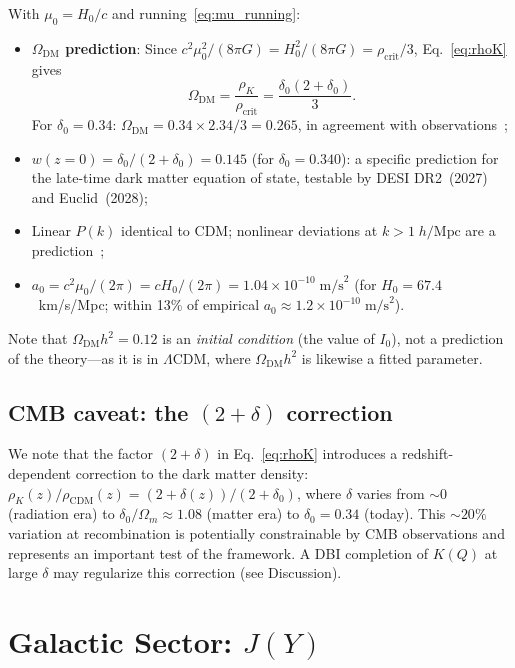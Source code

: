 \documentclass[prd,twocolumn,superscriptaddress,longbibliography,floatfix]{revtex4-2}
\begin{document}
With $\mu_0 = H_0/c$ and running~\eqref{eq:mu_running}:
\begin{itemize}
\item \textbf{$\Omega_{\mathrm{DM}}$ prediction}:
  Since $c^2\mu_0^2/(8\pi G) = H_0^2/(8\pi G) = \rho_{\mathrm{crit}}/3$,
  Eq.~\eqref{eq:rhoK} gives
  \begin{equation}
  \Omega_{\mathrm{DM}} = \frac{\rho_K}{\rho_{\mathrm{crit}}}
  = \frac{\delta_0(2+\delta_0)}{3}.
  \label{eq:OmegaDM}
  \end{equation}
  For $\delta_0 = 0.34$: $\Omega_{\mathrm{DM}} = 0.34 \times 2.34/3
  = 0.265$, in agreement with observations~\cite{Planck2018};
\item $w(z{=}0) = \delta_0/(2{+}\delta_0) = 0.145$
  (for $\delta_0 = 0.340$): a specific prediction for
  the late-time dark matter equation of state, testable by
  DESI DR2~(2027) and Euclid~(2028);
\item Linear $P(k)$ identical to CDM; nonlinear deviations
  at $k > 1\;h/\mathrm{Mpc}$ are a prediction~\cite{SZ2021prl};
\item $a_0 = c^2\mu_0/(2\pi) = cH_0/(2\pi) = 1.04 \times 10^{-10}\;\mathrm{m/s}^2$
  (for $H_0 = 67.4$~km/s/Mpc; within 13\% of empirical
  $a_0 \approx 1.2 \times 10^{-10}\;\mathrm{m/s}^2$).
\end{itemize}
Note that $\Omega_{\mathrm{DM}}h^2 = 0.12$ is an \emph{initial
condition} (the value of $I_0$), not a prediction of the theory---as
it is in $\Lambda$CDM, where $\Omega_{\mathrm{DM}}h^2$ is likewise
a fitted parameter.

\subsection{CMB caveat: the $(2{+}\delta)$ correction}
\label{sec:cmb_caveat}

We note that the factor $(2{+}\delta)$ in Eq.~\eqref{eq:rhoK}
introduces a redshift-dependent correction to the dark matter
density: $\rho_K(z)/\rho_{\mathrm{CDM}}(z) = (2{+}\delta(z))/(2{+}\delta_0)$,
where $\delta$ varies from $\sim\!0$ (radiation era) to
$\delta_0/\Omega_m \approx 1.08$ (matter era) to
$\delta_0 = 0.34$ (today).
This $\sim\!20\%$ variation at recombination is potentially
constrainable by CMB observations and represents an important
test of the framework.
A DBI completion of $K(Q)$ at large $\delta$ may regularize
this correction (see Discussion).


\section{Galactic Sector: $J(Y)$}
\label{sec:galactic}
\end{document}

